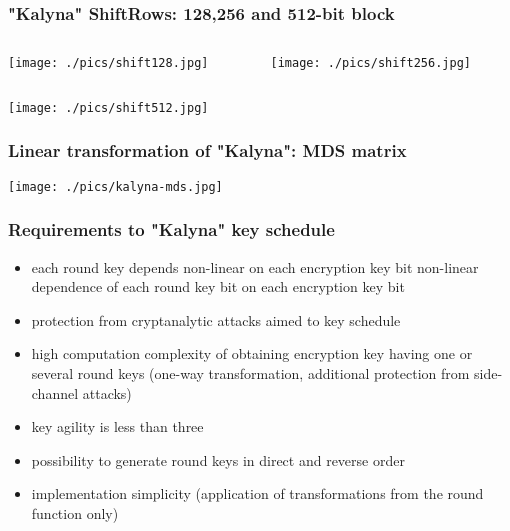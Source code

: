 \documentclass[12pt,mathserif]{beamer}
\begin{document}
	\begin{frame}
		\frametitle{"Kalyna" ShiftRows: 128,256 and 512-bit block}
		
		\begin{columns}[c]
			\begin{column}{.48\textwidth}
				\texttt{[image: ./pics/shift128.jpg]}
			\end{column}

			\begin{column}{.48\textwidth}
				\texttt{[image: ./pics/shift256.jpg]}
			\end{column}

		\end{columns}		

		\begin{center}
			\texttt{[image: ./pics/shift512.jpg]}
		\end{center}
		
		
	\end{frame}
	
	
	\begin{frame}
		\frametitle{Linear transformation of "Kalyna": MDS matrix}

	    \begin{center}
				\texttt{[image: ./pics/kalyna-mds.jpg]}    
		\end{center}			



	\end{frame}	
	
	\begin{frame}
		\frametitle {Requirements to "Kalyna" key schedule}
		
		\begin{itemize}
			\item each round key depends non-linear on each encryption key bit 
			non-linear dependence of each round key bit on each encryption key bit
			\item protection from cryptanalytic attacks aimed to key schedule
			\item high computation complexity of obtaining encryption key having one or several round keys (one-way transformation, additional protection from side-channel attacks)
			\item key agility is less than three
			\item possibility to generate round keys in direct and reverse order
			\item implementation simplicity (application of transformations from the round function only)
		\end{itemize}
	\end{frame}
\end{document}

